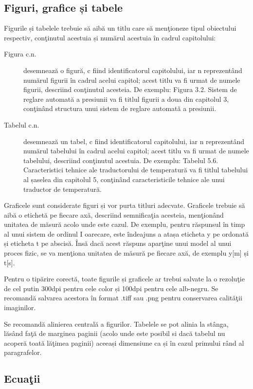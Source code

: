 \subsection{Figuri, grafice și tabele}

 Figurile și tabelele trebuie să aibă un titlu care să menţioneze tipul obiectului respectiv, conţinutul acestuia și numărul acestuia în cadrul capitolului:

\begin{description}
\item[Figura c.n.] desemnează o figură, c fiind identificatorul capitolului, iar n reprezentând numărul figurii în cadrul acelui capitol; acest titlu va fi urmat de numele figurii, descriind conţinutul acesteia. De exemplu: Figura 3.2. Sistem de reglare automată a presiunii va fi titlul figurii a doua din capitolul 3, conţinând structura unui sistem de reglare automată a presiunii. 
\item[Tabelul c.n.] desemnează un tabel, c fiind identificatorul capitolului, iar n reprezentând numărul tabelului în cadrul acelui capitol; acest titlu va fi urmat de numele tabelului, descriind conţinutul acestuia. De exemplu: Tabelul 5.6. Caracteristici tehnice ale traductorului de temperatură va fi titlul tabelului al șaselea din capitolul 5, conţinând caracteristicile tehnice ale unui traductor de temperatură.
\end{description}
Graficele sunt considerate figuri și vor purta titluri adecvate. Graficele trebuie să aibă o etichetă pe fiecare axă, descriind semnificaţia acesteia, menţionând unitatea de măsură acolo unde este cazul. De exemplu, pentru răspunsul în timp al unui sistem de ordinul I oarecare, este îndeajuns a atașa eticheta y pe ordonată și eticheta t pe abscisă. Însă dacă acest răspuns aparţine unui model al unui proces fizic, se va menţiona unitatea de măsură pe fiecare axă, de exemplu y[m] și t[s].

Pentru o tipărire corectă, toate figurile și graficele ar trebui salvate la o rezoluţie de cel putin 300dpi pentru cele color și 100dpi pentru cele alb-negru. Se recomandă salvarea acestora în format .tiff sau .png pentru conservarea calităţii imaginilor.

Se recomandă alinierea centrală a figurilor. Tabelele se pot alinia la stânga, lăsând faţă de marginea paginii (acolo unde este posibil si dacă tabelul nu acoperă toată lăţimea paginii) aceeași dimensiune ca și în cazul primului rând al paragrafelor.

\subsection{Ecuaţii}

